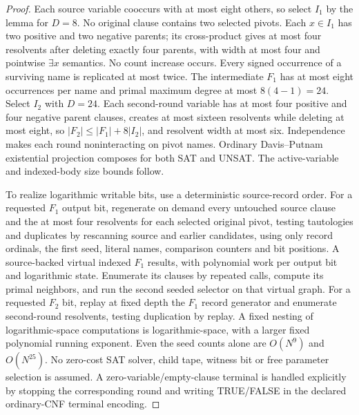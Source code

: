\documentclass[11pt]{article}
\begin{document}
\begin{proof}
Each source variable cooccurs with at most eight others, so select $I_1$ by the lemma for $D=8$. No original clause contains two selected pivots. Each $x\in I_1$ has two positive and two negative parents; its cross-product gives at most four resolvents after deleting exactly four parents, with width at most four and pointwise $\exists x$ semantics. No count increase occurs. Every signed occurrence of a surviving name is replicated at most twice. The intermediate $F_1$ has at most eight occurrences per name and primal maximum degree at most $8(4-1)=24$. Select $I_2$ with $D=24$. Each second-round variable has at most four positive and four negative parent clauses, creates at most sixteen resolvents while deleting at most eight, so $|F_2|\le |F_1|+8|I_2|$, and resolvent width at most six. Independence makes each round noninteracting on pivot names. Ordinary Davis--Putnam existential projection composes for both SAT and UNSAT. The active-variable and indexed-body size bounds follow.

To realize logarithmic writable bits, use a deterministic source-record order. For a requested $F_1$ output bit, regenerate on demand every untouched source clause and the at most four resolvents for each selected original pivot, testing tautologies and duplicates by rescanning source and earlier candidates, using only record ordinals, the first seed, literal names, comparison counters and bit positions. A source-backed virtual indexed $F_1$ results, with polynomial work per output bit and logarithmic state. Enumerate its clauses by repeated calls, compute its primal neighbors, and run the second seeded selector on that virtual graph. For a requested $F_2$ bit, replay at fixed depth the $F_1$ record generator and enumerate second-round resolvents, testing duplication by replay. A fixed nesting of logarithmic-space computations is logarithmic-space, with a larger fixed polynomial running exponent. Even the seed counts alone are $O(N^9)$ and $O(N^{25})$. No zero-cost SAT solver, child tape, witness bit or free parameter selection is assumed. A zero-variable/empty-clause terminal is handled explicitly by stopping the corresponding round and writing TRUE/FALSE in the declared ordinary-CNF terminal encoding.
\end{proof}
\end{document}
